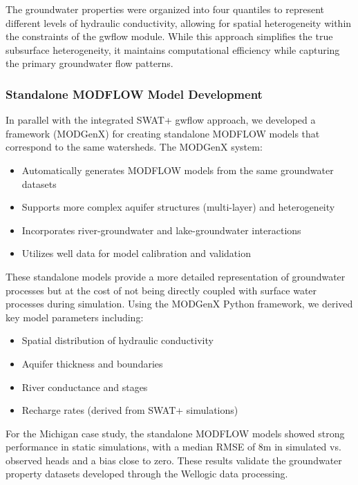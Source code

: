 \documentclass[final,3p,times]{elsarticle}
\begin{document}
The groundwater properties were organized into four quantiles to represent different levels of hydraulic conductivity, allowing for spatial heterogeneity within the constraints of the gwflow module. While this approach simplifies the true subsurface heterogeneity, it maintains computational efficiency while capturing the primary groundwater flow patterns.

\subsubsection{Standalone MODFLOW Model Development}
In parallel with the integrated SWAT+ gwflow approach, we developed a framework (MODGenX) for creating standalone MODFLOW models that correspond to the same watersheds. The MODGenX system:

\begin{itemize}
    \item Automatically generates MODFLOW models from the same groundwater datasets
    \item Supports more complex aquifer structures (multi-layer) and heterogeneity
    \item Incorporates river-groundwater and lake-groundwater interactions
    \item Utilizes well data for model calibration and validation
\end{itemize}

These standalone models provide a more detailed representation of groundwater processes but at the cost of not being directly coupled with surface water processes during simulation. Using the MODGenX Python framework, we derived key model parameters including:

\begin{itemize}
    \item Spatial distribution of hydraulic conductivity
    \item Aquifer thickness and boundaries
    \item River conductance and stages
    \item Recharge rates (derived from SWAT+ simulations)
\end{itemize}

For the Michigan case study, the standalone MODFLOW models showed strong performance in static simulations, with a median RMSE of 8m in simulated vs. observed heads and a bias close to zero. These results validate the groundwater property datasets developed through the Wellogic data processing.
\end{document}
